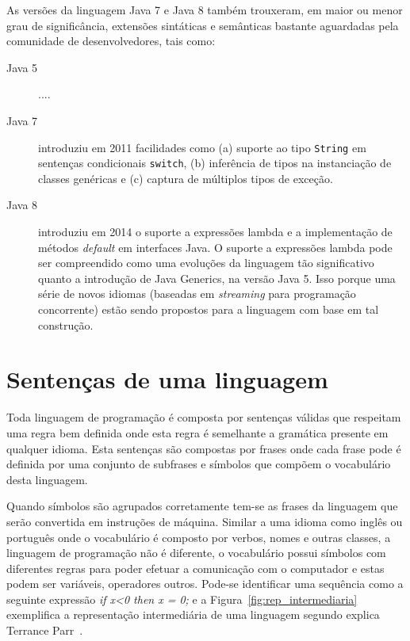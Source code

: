 As versões da linguagem Java 7 e Java 8 também trouxeram, 
em maior ou menor grau de significância, extensões sintáticas 
e semânticas bastante aguardadas pela comunidade de 
desenvolvedores, tais como:

\begin{description}
\item[Java 5] ....

\item[Java 7] introduziu em 2011 facilidades como (a) suporte ao tipo \texttt{String} 
em sentenças condicionais \texttt{switch}, (b) inferência de tipos na instanciação de classes genéricas e (c) captura de 
múltiplos tipos de exceção. 

\item[Java 8] introduziu em 2014 o suporte a expressões lambda e a implementação de 
métodos \emph{default} em interfaces Java. O suporte a expressões lambda pode 
ser compreendido como uma evoluções da linguagem tão significativo 
quanto a introdução de Java Generics, na versão Java 5. Isso porque 
uma série de novos idiomas (baseadas em \emph{streaming} para programação 
concorrente) estão sendo propostos para a linguagem com base em tal construção.   
\end{description} 


\section{Sentenças de uma linguagem}
Toda linguagem de programação é composta por sentenças válidas que respeitam uma regra bem definida onde esta regra é semelhante a gramática presente em qualquer idioma. Esta sentenças são compostas por frases onde cada frase pode é definida por uma conjunto de subfrases e símbolos que compõem o vocabulário desta linguagem. 


Quando símbolos são agrupados corretamente tem-se as frases da linguagem que serão convertida em instruções de máquina. Similar a uma idioma como inglês ou português onde o vocabulário é composto por verbos, nomes e outras classes, a linguagem de programação não é diferente, o vocabulário possui símbolos com diferentes regras para poder efetuar a comunicação com o computador e estas podem ser variáveis, operadores outros. Pode-se identificar uma sequência como a seguinte expressão \textit{if x<0 then x = 0;} e a Figura~\ref{fig:rep_intermediaria} exemplifica a representação intermediária de uma linguagem segundo explica Terrance Parr~\cite{Parr:2009:LIP:1823613}.


